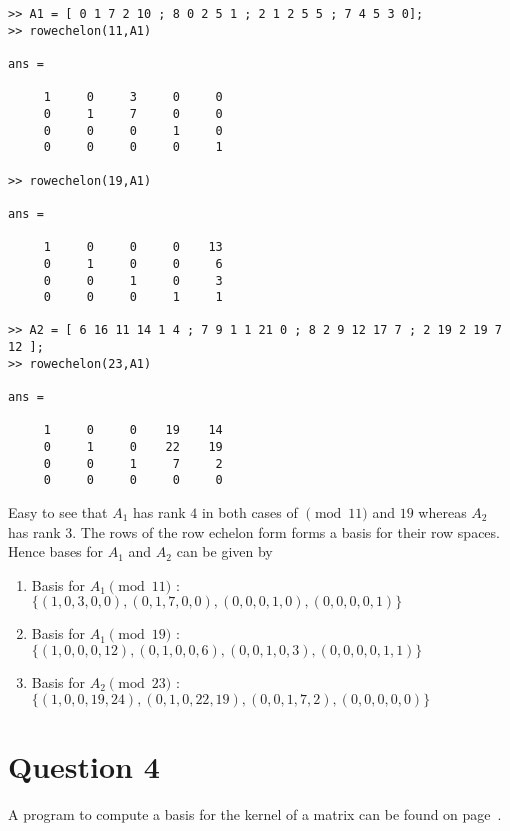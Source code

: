\documentclass[11pt]{article}
\begin{document}
\begin{verbatim}
>> A1 = [ 0 1 7 2 10 ; 8 0 2 5 1 ; 2 1 2 5 5 ; 7 4 5 3 0];
>> rowechelon(11,A1)

ans =

     1     0     3     0     0
     0     1     7     0     0
     0     0     0     1     0
     0     0     0     0     1

>> rowechelon(19,A1)

ans =

     1     0     0     0    13
     0     1     0     0     6
     0     0     1     0     3
     0     0     0     1     1

>> A2 = [ 6 16 11 14 1 4 ; 7 9 1 1 21 0 ; 8 2 9 12 17 7 ; 2 19 2 19 7 12 ];
>> rowechelon(23,A1)

ans =

     1     0     0    19    14
     0     1     0    22    19
     0     0     1     7     2
     0     0     0     0     0
\end{verbatim}

Easy to see that $A_1$ has rank $4$ in both cases of $\pmod 11$ and $19$ whereas $A_2$ has rank $3$. The rows of the row echelon form forms a basis for their row spaces. Hence bases for $A_1$ and $A_2$ can be given by
\begin{enumerate}
\item Basis for $A_1 \pmod{11}$ : $\{(1,0,3,0,0),(0,1,7,0,0),(0,0,0,1,0),(0,0,0,0,1)\}$
\item Basis for $A_1 \pmod{19}$ : $\{(1,0,0,0,12),(0,1,0,0,6),(0,0,1,0,3),(0,0,0,0,1,1)\}$
\item Basis for $A_2 \pmod{23}$ : $\{(1,0,0,19,24),(0,1,0,22,19),(0,0,1,7,2),(0,0,0,0,0)\}$
\end{enumerate}







\section*{Question 4} A program to compute a basis for the kernel of a matrix can be found on page~\pageref{sec:program4}. 

\end{document}
